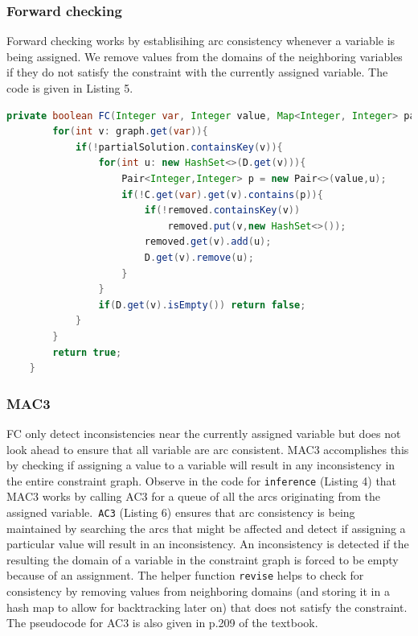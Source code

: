 \documentclass[9.5pt]{extarticle}
\begin{document}
\subsubsection{Forward checking}

Forward checking works by establisihing arc consistency whenever a variable is being assigned. We remove values from the domains of the neighboring variables if they do not satisfy the constraint with the currently assigned variable. The code is given in Listing 5.

\begin{lstlisting}[language=java,caption={Forward checking}]
    private boolean FC(Integer var, Integer value, Map<Integer, Integer> partialSolution, Map<Integer, Set<Integer>> removed){
        for(int v: graph.get(var)){
            if(!partialSolution.containsKey(v)){
                for(int u: new HashSet<>(D.get(v))){
                    Pair<Integer,Integer> p = new Pair<>(value,u);
                    if(!C.get(var).get(v).contains(p)){
                        if(!removed.containsKey(v)) 
                            removed.put(v,new HashSet<>());
                        removed.get(v).add(u);
                        D.get(v).remove(u);
                    }
                }
                if(D.get(v).isEmpty()) return false;
            }
        }
        return true;
    }
\end{lstlisting} 

\subsubsection{MAC3}

FC only detect inconsistencies near the currently assigned variable but does not look ahead to ensure that all variable are arc consistent. MAC3 accomplishes this by checking if assigning a value to a variable will result in any inconsistency in the entire constraint graph. Observe in the code for \verb`inference` (Listing 4) that MAC3 works by calling AC3 for a queue of all the arcs originating from the assigned variable.\verb` AC3` (Listing 6) ensures that arc consistency is being maintained by searching the arcs that might be affected and detect if assigning a particular value will result in an inconsistency. An inconsistency is detected if the resulting the domain of a variable in the constraint graph is forced to be empty because of an assignment. The helper function \verb`revise` helps to check for consistency by removing  values from neighboring domains (and storing it in a hash map to allow for backtracking later on) that does not satisfy the constraint. The pseudocode for AC3 is also given in p.209 of the textbook.
\end{document}
